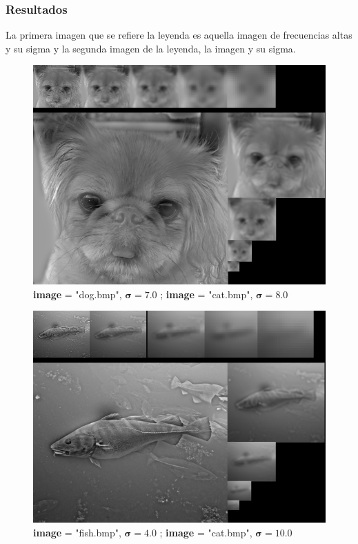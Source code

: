 \documentclass{article}
\begin{document}
\newpage

\subsubsection{Resultados}
La primera imagen que se refiere la leyenda es aquella imagen de frecuencias altas y su sigma y la segunda imagen de la leyenda, la imagen y su sigma.

\begin{figure}[hbt!]
	\centering
	\includegraphics[width=.9\textwidth]{assets/ex1-A/dog_cat_s8_s7.png}
	\caption{\textbf{image} = "dog.bmp", $\boldsymbol{\sigma} = 7.0$ ; \textbf{image} = "cat.bmp", $\boldsymbol{\sigma} = 8.0$}
\end{figure}
\begin{figure}[hbt!]
	\centering
	\includegraphics[width=.9\textwidth]{assets/ex1-A/fish_sub_s4_s10.png}
	\caption{\textbf{image} = "fish.bmp", $\boldsymbol{\sigma} = 4.0$ ; \textbf{image} = "cat.bmp", $\boldsymbol{\sigma} = 10.0$}
\end{figure}
\end{document}
